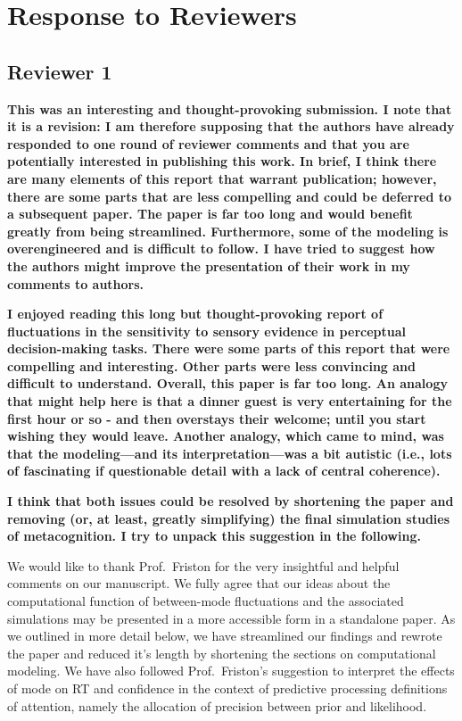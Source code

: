 \documentclass[
]{article}
\begin{document}
\newpage

\hypertarget{response-to-reviewers}{%
\section{Response to Reviewers}\label{response-to-reviewers}}

\hypertarget{reviewer-1}{%
\subsection{Reviewer 1}\label{reviewer-1}}

\textbf{This was an interesting and thought-provoking submission. I note
that it is a revision: I am therefore supposing that the authors have
already responded to one round of reviewer comments and that you are
potentially interested in publishing this work. In brief, I think there
are many elements of this report that warrant publication; however,
there are some parts that are less compelling and could be deferred to a
subsequent paper. The paper is far too long and would benefit greatly
from being streamlined. Furthermore, some of the modeling is
overengineered and is difficult to follow. I have tried to suggest how
the authors might improve the presentation of their work in my comments
to authors.}

\textbf{I enjoyed reading this long but thought-provoking report of
fluctuations in the sensitivity to sensory evidence in perceptual
decision-making tasks. There were some parts of this report that were
compelling and interesting. Other parts were less convincing and
difficult to understand. Overall, this paper is far too long. An analogy
that might help here is that a dinner guest is very entertaining for the
first hour or so - and then overstays their welcome; until you start
wishing they would leave. Another analogy, which came to mind, was that
the modeling---and its interpretation---was a bit autistic (i.e., lots
of fascinating if questionable detail with a lack of central
coherence).}

\textbf{I think that both issues could be resolved by shortening the
paper and removing (or, at least, greatly simplifying) the final
simulation studies of metacognition. I try to unpack this suggestion in
the following.}

We would like to thank Prof.~Friston for the very insightful and helpful
comments on our manuscript. We fully agree that our ideas about the
computational function of between-mode fluctuations and the associated
simulations may be presented in a more accessible form in a standalone
paper. As we outlined in more detail below, we have streamlined our
findings and rewrote the paper and reduced it's length by shortening the
sections on computational modeling. We have also followed
Prof.~Friston's suggestion to interpret the effects of mode on RT and
confidence in the context of predictive processing definitions of
attention, namely the allocation of precision between prior and
likelihood.
\end{document}
